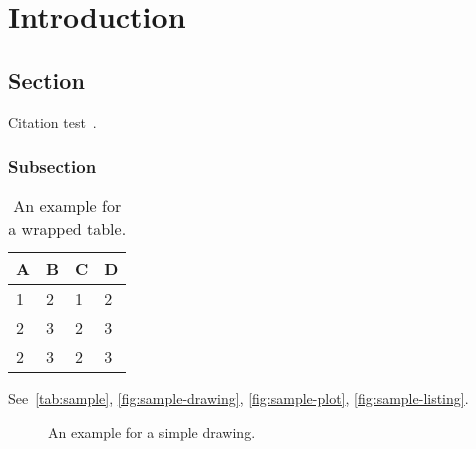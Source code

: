 
\chapter{Introduction}\label{chapter:introduction}

\section{Section}
Citation test~\parencite{latex}.

\subsection{Subsection}


\begin{wraptable}{r}{5.5cm}
    \centering
    \begin{tabular}{l l l l}
      \toprule
      \multicolumn{1}{c}{\textbf{A}\footnotemark} & \textbf{B} & \textbf{C} & \textbf{D} \\
      \midrule
        1\footnotemark & 2 & 1 & 2 \\ \rowcolor{TUMAccentLightBlue!30}
        2 & 3 & 2 & 3 \\
        2 & 3 & 2 & 3 \\
      \bottomrule
    \end{tabular}
    \caption[Example table]{An example for a wrapped table.}\label{tab:sample}
  \end{wraptable}
  \addtocounter{footnote}{-1}
  \addtocounter{footnote}{1}
See~\autoref{tab:sample}, \autoref{fig:sample-drawing}, \autoref{fig:sample-plot}, \autoref{fig:sample-listing}.

\lipsum[1-2]


\begin{figure}[htpb]
  \centering
  \caption[Example drawing]{An example for a simple drawing.}\label{fig:sample-drawing}
\end{figure}

